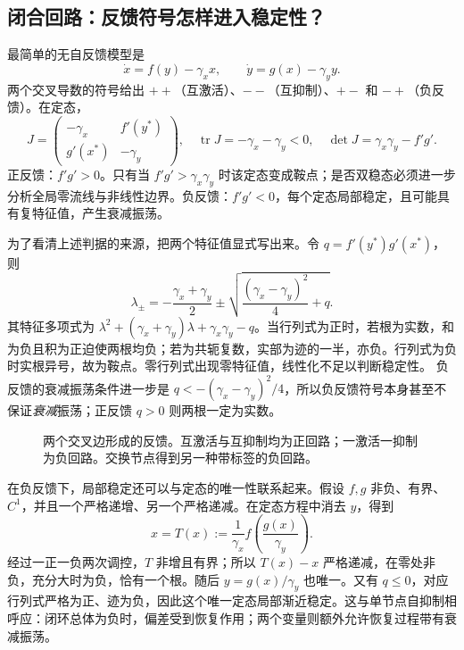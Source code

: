 \documentclass[11pt,a4paper,UTF8,fontset=fandol]{ctexart}
\begin{document}
\subsection{闭合回路：反馈符号怎样进入稳定性？}
最简单的无自反馈模型是
\begin{equation}\dot x=f(y)-\gamma_xx,\qquad\dot y=g(x)-\gamma_yy.\label{eq:two}\end{equation}
两个交叉导数的符号给出 $++$（互激活）、$--$（互抑制）、$+-$ 和 $-+$（负反馈）。在定态，
\begin{equation}J=\begin{pmatrix}-\gamma_x&f'(y^*)\\g'(x^*)&-\gamma_y\end{pmatrix},\quad \operatorname{tr}J=-\gamma_x-\gamma_y<0,\quad\det J=\gamma_x\gamma_y-f'g'.\end{equation}
正反馈：$f'g'>0$。只有当 $f'g'>\gamma_x\gamma_y$ 时该定态变成鞍点；是否双稳态必须进一步分析全局零流线与非线性边界。负反馈：$f'g'<0$，每个定态局部稳定，且可能具有复特征值，产生衰减振荡。

为了看清上述判据的来源，把两个特征值显式写出来。令 $q=f'(y^*)g'(x^*)$，则
\[
\lambda_{\pm}=-\frac{\gamma_x+\gamma_y}{2}
\pm\sqrt{\frac{(\gamma_x-\gamma_y)^2}{4}+q}.
\]
其特征多项式为 $\lambda^2+(\gamma_x+\gamma_y)\lambda+\gamma_x\gamma_y-q$。当行列式为正时，若根为实数，和为负且积为正迫使两根均负；若为共轭复数，实部为迹的一半，亦负。行列式为负时实根异号，故为鞍点。零行列式出现零特征值，线性化不足以判断稳定性。
负反馈的衰减振荡条件进一步是
$q<-(\gamma_x-\gamma_y)^2/4$，所以负反馈符号本身甚至不保证\emph{衰减}振荡；正反馈 $q>0$ 则两根一定为实数。
\begin{figure}[H]\centering
{}
\caption{两个交叉边形成的反馈。互激活与互抑制均为正回路；一激活一抑制为负回路。交换节点得到另一种带标签的负回路。}
\end{figure}

在负反馈下，局部稳定还可以与定态的唯一性联系起来。假设 $f,g$ 非负、有界、$C^1$，并且一个严格递增、另一个严格递减。在定态方程中消去 $y$，得到
\[
x=T(x):=\frac1{\gamma_x}f\!\left(\frac{g(x)}{\gamma_y}\right).
\]
经过一正一负两次调控，$T$ 非增且有界；所以 $T(x)-x$ 严格递减，在零处非负，充分大时为负，恰有一个根。随后 $y=g(x)/\gamma_y$ 也唯一。又有 $q\leq0$，对应行列式严格为正、迹为负，因此这个唯一定态局部渐近稳定。这与单节点自抑制相呼应：闭环总体为负时，偏差受到恢复作用；两个变量则额外允许恢复过程带有衰减振荡。
\end{document}

